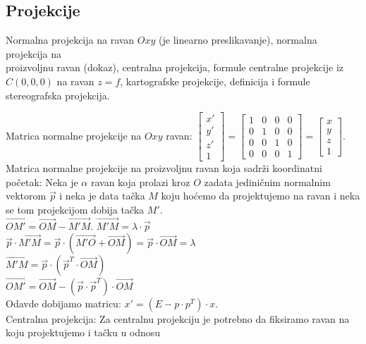 \documentclass[12pt]{article}
\newcommand{\vek}[1]{\overrightarrow{#1}}
\begin{document}
\subsection{Projekcije}
Normalna projekcija na ravan $Oxy$ (je linearno preslikavanje),
normalna projekcija na \\proizvoljnu ravan (dokaz),
centralna projekcija, formule centralne projekcije iz
$C(0,0,0)$ na ravan $z=f$, kartografske projekcije,
definicija i formule stereografska projekcija.\par

\vspace*{1cm}

Matrica normalne projekcije na $Oxy$ ravan:
$\begin{bmatrix}
        x' \\
        y' \\
        z' \\
        1
    \end{bmatrix}=\begin{bmatrix}
        1 & 0 & 0 & 0 \\
        0 & 1 & 0 & 0 \\
        0 & 0 & 1 & 0 \\
        0 & 0 & 0 & 1
    \end{bmatrix}=\begin{bmatrix}
        x \\
        y \\
        z \\
        1
    \end{bmatrix}$.\\
Matrica normalne projekcije na proizvoljnu ravan koja sadrži koordinatni početak:
Neka je $\alpha$ ravan koja prolazi kroz $O$ zadata jediničnim
normalnim vektorom $\vek{p}$ i neka je data tačka $M$
koju hoćemo da projektujemo na ravan i neka se
tom projekcijom dobija tačka $M'$.\\
$\vek{OM'}=\vek{OM}-\vek{M'M}$.
$\vek{M'M}=\lambda\cdot\vek{p}$\\
$\vek{p}\cdot\vek{M'M}=\vek{p}\cdot(\vek{M'O}+\vek{OM})=\vek{p}\cdot\vek{OM}=\lambda$\\
$\vek{M'M}=\vek{p}\cdot (\vek{p}^T\cdot\vek{OM})$\\
$\vek{OM'}=\vek{OM}-(\vek{p}\cdot \vek{p}^T)\cdot\vek{OM}$\\
Odavde dobijamo matricu: $x'=(E-p\cdot p^T)\cdot x$.\\
Centralna projekcija: Za centralnu projekciju je potrebno
da fiksiramo ravan na koju projektujemo i tačku u odnosu
\end{document}
